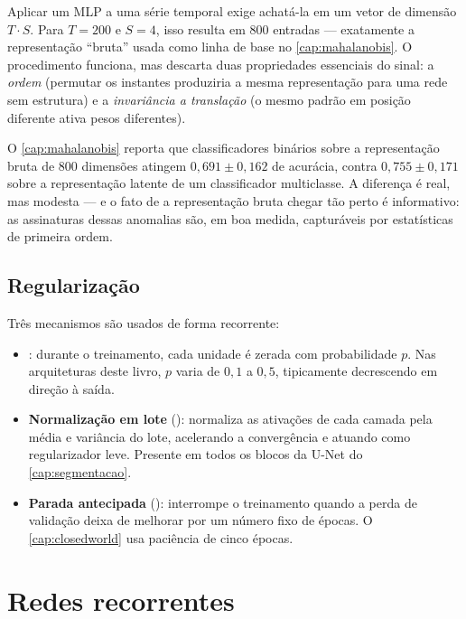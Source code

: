 Aplicar um MLP a uma série temporal exige achatá-la em um vetor de dimensão $T \cdot S$.
Para $T = 200$ e $S = 4$, isso resulta em \num{800} entradas --- exatamente a
representação ``bruta'' usada como linha de base no \cref{cap:mahalanobis}. O
procedimento funciona, mas descarta duas propriedades essenciais do sinal: a
\emph{ordem} (permutar os instantes produziria a mesma representação para uma rede sem
estrutura) e a \emph{invariância a translação} (o mesmo padrão em posição diferente
ativa pesos diferentes).

\begin{destaque}
O \cref{cap:mahalanobis} reporta que classificadores binários sobre a representação
bruta de \num{800} dimensões atingem $0{,}691 \pm 0{,}162$ de acurácia, contra
$0{,}755 \pm 0{,}171$ sobre a representação latente de um classificador multiclasse. A
diferença é real, mas modesta --- e o fato de a representação bruta chegar tão perto é
informativo: as assinaturas dessas anomalias são, em boa medida, capturáveis por
estatísticas de primeira ordem.
\end{destaque}

\subsection{Regularização}

Três mecanismos são usados de forma recorrente:

\begin{itemize}[leftmargin=*,itemsep=0.3em]
  \item \textbf{} \citep{srivastava14a}: durante o treinamento, cada
        unidade é zerada com probabilidade $p$. Nas arquiteturas deste livro, $p$ varia
        de $0{,}1$ a $0{,}5$, tipicamente decrescendo em direção à saída.
  \item \textbf{Normalização em lote} (): normaliza as ativações
        de cada camada pela média e variância do lote, acelerando a convergência e
        atuando como regularizador leve. Presente em todos os blocos da U-Net do
        \cref{cap:segmentacao}.
  \item \textbf{Parada antecipada} (): interrompe o treinamento
        quando a perda de validação deixa de melhorar por um número fixo de épocas.
        O \cref{cap:closedworld} usa paciência de cinco épocas.
\end{itemize}

\section{Redes recorrentes}

